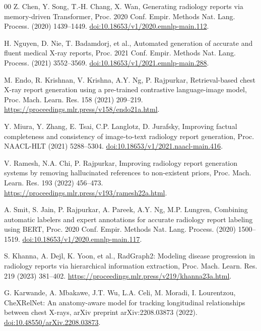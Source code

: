 \documentclass[preprint,12pt]{elsarticle}
\begin{document}
\begin{thebibliography}{00}
Z. Chen, Y. Song, T.-H. Chang, X. Wan,
Generating radiology reports via memory-driven Transformer,
Proc. 2020 Conf. Empir. Methods Nat. Lang. Process. (2020) 1439--1449.
\href{https://doi.org/10.18653/v1/2020.emnlp-main.112}{doi:10.18653/v1/2020.emnlp-main.112}.

H. Nguyen, D. Nie, T. Badamdorj, et al.,
Automated generation of accurate and fluent medical X-ray reports,
Proc. 2021 Conf. Empir. Methods Nat. Lang. Process. (2021) 3552--3569.
\href{https://doi.org/10.18653/v1/2021.emnlp-main.288}{doi:10.18653/v1/2021.emnlp-main.288}.

M. Endo, R. Krishnan, V. Krishna, A.Y. Ng, P. Rajpurkar,
Retrieval-based chest X-ray report generation using a pre-trained contrastive
language-image model,
Proc. Mach. Learn. Res. 158 (2021) 209--219.
\url{https://proceedings.mlr.press/v158/endo21a.html}.

Y. Miura, Y. Zhang, E. Tsai, C.P. Langlotz, D. Jurafsky,
Improving factual completeness and consistency of image-to-text radiology
report generation,
Proc. NAACL-HLT (2021) 5288--5304.
\href{https://doi.org/10.18653/v1/2021.naacl-main.416}{doi:10.18653/v1/2021.naacl-main.416}.

V. Ramesh, N.A. Chi, P. Rajpurkar,
Improving radiology report generation systems by removing hallucinated
references to non-existent priors,
Proc. Mach. Learn. Res. 193 (2022) 456--473.
\url{https://proceedings.mlr.press/v193/ramesh22a.html}.

A. Smit, S. Jain, P. Rajpurkar, A. Pareek, A.Y. Ng, M.P. Lungren,
Combining automatic labelers and expert annotations for accurate radiology
report labeling using BERT,
Proc. 2020 Conf. Empir. Methods Nat. Lang. Process. (2020) 1500--1519.
\href{https://doi.org/10.18653/v1/2020.emnlp-main.117}{doi:10.18653/v1/2020.emnlp-main.117}.

S. Khanna, A. Dejl, K. Yoon, et al.,
RadGraph2: Modeling disease progression in radiology reports via hierarchical
information extraction,
Proc. Mach. Learn. Res. 219 (2023) 381--402.
\url{https://proceedings.mlr.press/v219/khanna23a.html}.

G. Karwande, A. Mbakawe, J.T. Wu, L.A. Celi, M. Moradi, I. Lourentzou,
CheXRelNet: An anatomy-aware model for tracking longitudinal relationships
between chest X-rays,
arXiv preprint arXiv:2208.03873 (2022).
\href{https://doi.org/10.48550/arXiv.2208.03873}{doi:10.48550/arXiv.2208.03873}.


\end{thebibliography}
\end{document}
